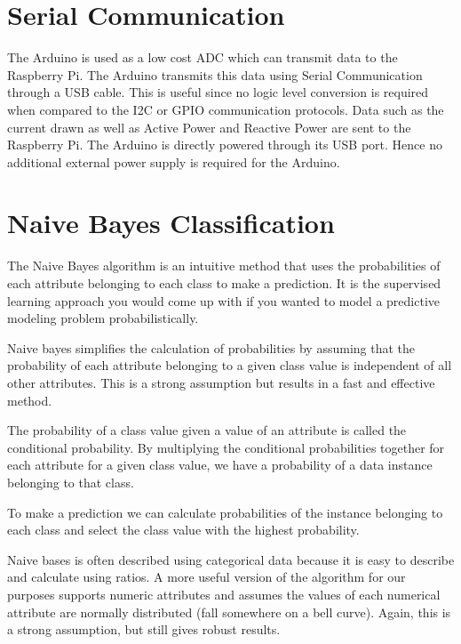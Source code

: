 \section{Serial Communication}
{
The Arduino is used as a low cost ADC which can transmit data to the Raspberry Pi.
The Arduino transmits this data using Serial Communication through a USB cable. This is useful since no logic level conversion is required when compared to the I2C or GPIO communication protocols.
Data such as the current drawn as well as Active Power and Reactive Power are sent to the Raspberry Pi.
The Arduino is directly powered through its USB port. Hence no additional external power supply is required for the Arduino.


}

\section{Naive Bayes Classification}
{
The Naive Bayes algorithm is an intuitive method that uses the probabilities of each attribute belonging to each class to make a prediction. It is the supervised learning approach you would come up with if you wanted to model a predictive modeling problem probabilistically.

Naive bayes simplifies the calculation of probabilities by assuming that the probability of each attribute belonging to a given class value is independent of all other attributes. This is a strong assumption but results in a fast and effective method.

The probability of a class value given a value of an attribute is called the conditional probability. By multiplying the conditional probabilities together for each attribute for a given class value, we have a probability of a data instance belonging to that class.

To make a prediction we can calculate probabilities of the instance belonging to each class and select the class value with the highest probability.

Naive bases is often described using categorical data because it is easy to describe and calculate using ratios. A more useful version of the algorithm for our purposes supports numeric attributes and assumes the values of each numerical attribute are normally distributed (fall somewhere on a bell curve). Again, this is a strong assumption, but still gives robust results.
}

